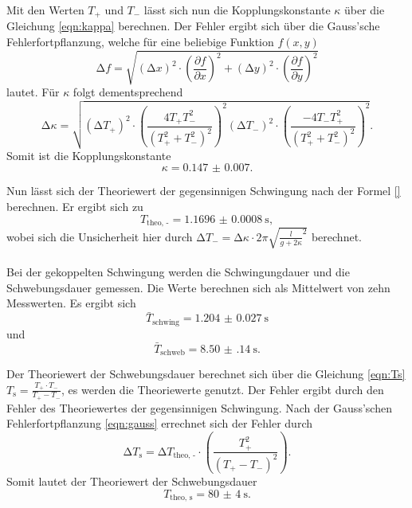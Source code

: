   \noindent Mit den Werten $T_{+}$ und $T_{-}$ lässt sich nun die Kopplungskonstante $\kappa$ über die Gleichung \eqref{eqn:kappa} berechnen. Der Fehler ergibt sich über die 
  Gauss'sche Fehlerfortpflanzung, welche für eine beliebige Funktion $f(x,y) $ 
  \begin{equation} \label{eqn:gauss}
    \increment f = \sqrt{(\increment x)^2 \cdot \left(\frac{\partial f}{\partial x}\right)^2 + (\increment y)^2 \cdot \left(\frac{\partial f}{\partial y}\right)^2}
  \end{equation}
  lautet. Für $\kappa $ folgt dementsprechend 
  \begin{equation} \label{eqn:fehlerk}
    \increment \kappa = \sqrt{(\increment T_{+})^2 \cdot \left( \frac{4 T_{+} T_{-}^2}{(T_{+}^2 + T_{-}^2)^2}\right)^2
                           (\increment T_{-})^2 \cdot \left( \frac{-4 T_{-} T_{+}^2}{(T_{+}^2 + T_{-}^2)^2}\right)^2 }. 
  \end{equation} 
  Somit ist die Kopplungskonstante 
  \begin{equation*}
    \kappa = \num{0.147(7)}.
  \end{equation*}

  \noindent Nun lässt sich der Theoriewert der gegensinnigen Schwingung nach der Formel \eqref{} berechnen. Er ergibt sich zu 
  \begin{equation*}
    T_{\text{theo, -}} = \SI{1.1696(8)}{\second}, 
  \end{equation*} 
  wobei sich die Unsicherheit hier durch $\increment T_{-} = \increment \kappa \cdot 2 \pi \sqrt{\frac{l}{g + 2\kappa }^2} $ berechnet. \\ \\

  \noindent Bei der gekoppelten Schwingung werden die Schwingungdauer und die Schwebungsdauer gemessen. Die Werte berechnen sich als Mittelwert von zehn Messwerten.
  Es ergibt sich
  \begin{equation*}
    \bar{T}_{\text{schwing}} = \SI{1.204(27)}{\second}
  \end{equation*} 
  und
  \begin{equation*}
    \bar{T}_{\text{schweb}} = \SI{8.50(14)}{\second}.
  \end{equation*}

  \noindent Der Theoriewert der Schwebungsdauer berechnet sich über die Gleichung \eqref{eqn:Ts} $T_{\text{s}} = \frac{T_{+} \cdot T_{-}}{T_{+} - T_{-}}$, es werden
  die Theoriewerte genutzt. Der Fehler ergibt durch den Fehler des Theoriewertes der gegensinnigen Schwingung. Nach der Gauss'schen Fehlerfortpflanzung \eqref{eqn:gauss}
  errechnet sich der Fehler durch 
  \begin{equation}\label{eqn:fehlerts}
    \increment T_{\text{s}} = \increment T_{\text{theo, -}} \cdot \left(\frac{T_{+}^2}{(T_{+} - T_{-})^2}\right).
  \end{equation}
  Somit lautet der Theoriewert der Schwebungsdauer
  \begin{equation*}
    T_ {\text{theo, s}} = \SI{80(4)}{\second}. 
  \end{equation*} \\ \\

